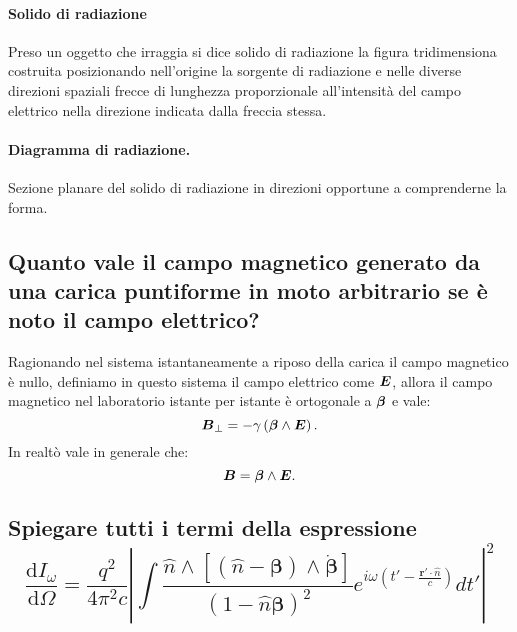 \paragraph{Solido di radiazione}
\label{par:Solido di radiazione.}
Preso un oggetto che irraggia si dice solido di radiazione la figura tridimensiona costruita posizionando nell'origine la sorgente di radiazione e nelle diverse direzioni spaziali frecce di lunghezza proporzionale all'intensità del campo elettrico nella direzione indicata dalla freccia stessa.

\paragraph{Diagramma di radiazione.}%
\label{par:Diagramma di radiazione.}
Sezione planare del solido di radiazione in direzioni opportune a comprenderne la forma. 

\subsection[\hspace{1mm} Campo magnetico in funzione del campo elettrico per carica puntiforme]{Quanto vale il campo magnetico generato da una carica puntiforme in moto arbitrario se è noto il campo elettrico?}
\label{sec:3.a.13}
Ragionando nel sistema istantaneamente a riposo della carica il campo magnetico è nullo, definiamo in questo sistema il campo elettrico come $\boldsymbol{E}$, allora il campo magnetico nel laboratorio istante per istante è ortogonale a $\boldsymbol{\beta}$ e vale:
\[
	\boldsymbol{B}_{\bot}= - \gamma \left( \boldsymbol{\beta}\wedge \boldsymbol{E}  \right) 
.\] 
In realtò vale in generale che:
\[
	\boldsymbol{B}= \boldsymbol{\beta}\wedge \boldsymbol{E} 
.\] 
\subsection[\hspace{1mm} Distribuzione angolare di energia irraggiata per unità di frequenza]{Spiegare tutti i termi della espressione 
\[
	\frac{\mbox{d} I_{\omega}}{\mbox{d} \Omega} = \frac{q^2}{4 \pi^2 c} \left| \int{ \frac{\hat{n} \wedge \left[ \left( \hat{n}-\boldsymbol{\beta}\right) \wedge \dot{\boldsymbol{\beta}} \right]}{\left( 1- \hat{n} \boldsymbol{\beta}\right)^2} e^{i\omega \left( t' - \frac{\boldsymbol{r'} \cdot \hat{n}}{c} \right) }  } dt' \right|^2
\] 
}

